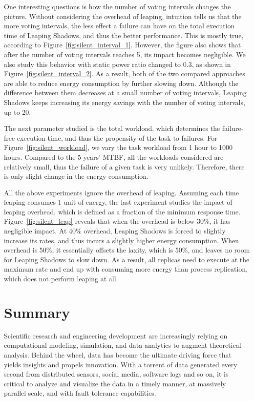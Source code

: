 One interesting questions is how the number of voting intervals changes the picture. Without considering the overhead of leaping, intuition tells us that the more voting intervals, the less effect a failure can have on the total execution time of Leaping Shadows, and thus the better performance. This is mostly true, according to Figure~\ref{fig:silent_interval_1}. However, the figure also shows that after the number of voting intervals reaches 5, its impact becomes negligible. We also study this behavior with static power ratio changed to 0.3, as shown in Figure~\ref{fig:silent_interval_2}. 
As a result, both of the two compared approaches are able to reduce energy consumption by further slowing down. 
Although the difference between them decreases at a small number of voting intervals, Leaping Shadows keeps increasing its energy savings with the number of voting intervals, up to 20.

The next parameter studied is the total workload, which determines the failure-free execution time, and thus the propensity of the task to failures. For Figure~\ref{fig:silent_workload}, we vary the task workload from 1 hour to 1000 hours. Compared to the 5 years' MTBF, all the workloads considered are relatively small, thus the failure of a given task is very unlikely. Therefore, there is only slight change in the energy consumption. 

All the above experiments ignore the overhead of leaping. Assuming each time leaping consumes 1 unit of energy, the last experiment studies the impact of leaping overhead, which is defined as a fraction of the minimum response time. Figure~\ref{fig:silent_leap} reveals that when the overhead is below 30\%, it has negligible impact. At 40\% overhead, Leaping Shadows is forced to slightly increase its rates, and thus incurs a slightly higher energy consumption. When overhead is 50\%, it essentially offsets the laxity, which is 50\%, and leaves no room for Leaping Shadows to slow down. As a result, all replicas need to execute at the maximum rate and end up with consuming more energy than process replication, which does not perform leaping at all.

\section{Summary}
Scientific research and engineering development are increasingly relying on computational modeling, simulation, and data analytics to augment theoretical analysis. Behind the wheel, data has become the ultimate driving force that yields insights and propels innovation. With a torrent of data generated every second from distributed sensors, social media, software logs and so on, it is critical to analyze and visualize the data in a timely manner,  at massively parallel scale, and with fault tolerance capabilities. 

